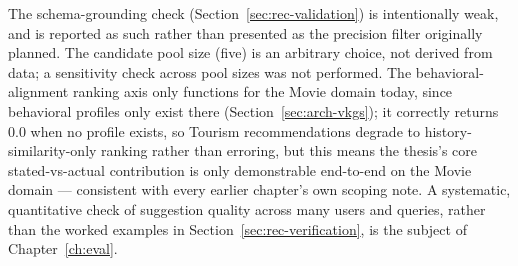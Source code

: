 The schema-grounding check (Section~\ref{sec:rec-validation}) is intentionally weak, and is reported
as such rather than presented as the precision filter originally planned. The candidate pool size
(five) is an arbitrary choice, not derived from data; a sensitivity check across pool sizes was not
performed. The behavioral-alignment ranking axis only functions for the Movie domain today, since
behavioral profiles only exist there (Section~\ref{sec:arch-vkgs}); it correctly returns $0.0$ when
no profile exists, so Tourism recommendations degrade to history-similarity-only ranking rather than
erroring, but this means the thesis's core stated-vs-actual contribution is only demonstrable
end-to-end on the Movie domain --- consistent with every earlier chapter's own scoping note. A
systematic, quantitative check of suggestion quality across many users and queries, rather than the
worked examples in Section~\ref{sec:rec-verification}, is the subject of Chapter~\ref{ch:eval}.
